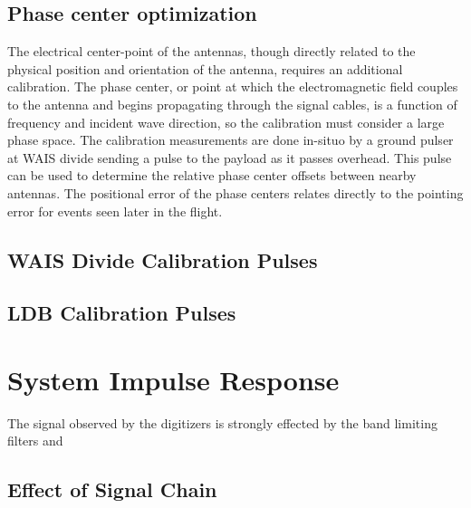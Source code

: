 		
	\subsection{Phase center optimization}
		The electrical center-point of the antennas, though directly related to the physical position and orientation of the antenna, requires an additional calibration.  The phase center, or point at which the electromagnetic field couples to the antenna and begins propagating through the signal cables, is a function of frequency and incident wave direction, so the calibration must consider a large phase space.  The calibration measurements are done in-situo by a ground pulser at WAIS divide sending a pulse to the payload as it passes overhead.  This pulse can be used to determine  the relative phase center offsets between nearby antennas.  The positional error of the phase centers relates directly to the pointing error for events seen later in the flight.

	\subsection{WAIS Divide Calibration Pulses}
	\subsection{LDB Calibration Pulses}

\section{System Impulse Response}
		The signal observed by the digitizers is strongly effected by the band limiting filters and 
	\subsection{Effect of Signal Chain}
	
